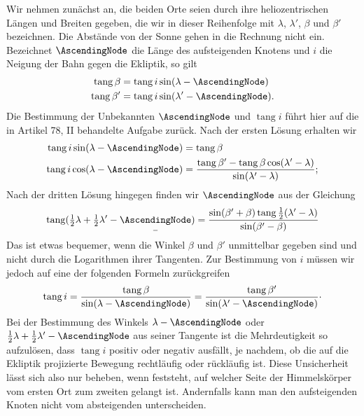 Wir nehmen zunächst an, die beiden Orte seien durch ihre heliozentrischen Längen und Breiten gegeben, die wir in dieser Reihenfolge mit $\lambda$, $\lambda'$, $\beta$ und $\beta'$ bezeichnen. Die Abstände von der Sonne gehen in die Rechnung nicht ein. Bezeichnet $\AscendingNode$ die Länge des aufsteigenden Knotens und $i$ die Neigung der Bahn gegen die Ekliptik, so gilt
\[
\begin{aligned}
\operatorname{tang}\beta&=\operatorname{tang}i\sin(\lambda-\AscendingNode)\\
\operatorname{tang}\beta'&=\operatorname{tang}i\sin(\lambda'-\AscendingNode).
\end{aligned}
\]
Die Bestimmung der Unbekannten $\AscendingNode$ und $\operatorname{tang}i$ führt hier auf die in Artikel 78, II behandelte Aufgabe zurück. Nach der ersten Lösung erhalten wir
\[
\begin{aligned}
\operatorname{tang}i\sin(\lambda-\AscendingNode)&=\operatorname{tang}\beta\\
\operatorname{tang}i\cos(\lambda-\AscendingNode)&=\frac{\operatorname{tang}\beta'-\operatorname{tang}\beta\cos(\lambda'-\lambda)}{\sin(\lambda'-\lambda)};
\end{aligned}
\]
Nach der dritten Lösung hingegen finden wir $\AscendingNode$ aus der Gleichung
\[
\operatorname{tang}(\tfrac12\lambda+\tfrac12\lambda'-\underset{\rule{.45em}{.35pt}}{\AscendingNode})=\frac{\sin(\beta'+\beta)\operatorname{tang}\tfrac12(\lambda'-\lambda)}{\sin(\beta'-\beta)}
\]
Das ist etwas bequemer, wenn die Winkel $\beta$ und $\beta'$ unmittelbar gegeben sind und nicht durch die Logarithmen ihrer Tangenten. Zur Bestimmung von $i$ müssen wir jedoch auf eine der folgenden Formeln zurückgreifen
\[
\operatorname{tang}i=\frac{\operatorname{tang}\beta}{\sin(\lambda-\AscendingNode)}=\frac{\operatorname{tang}\beta'}{\sin(\lambda'-\AscendingNode)}\mathpunct{\cdot}
\]
Bei der Bestimmung des Winkels $\lambda-\AscendingNode$ oder $\tfrac12\lambda+\tfrac12\lambda'-\AscendingNode$ aus seiner Tangente ist die Mehrdeutigkeit so aufzulösen, dass $\operatorname{tang}i$ positiv oder negativ ausfällt, je nachdem, ob die auf die Ekliptik projizierte Bewegung rechtläufig oder rückläufig ist. Diese Unsicherheit lässt sich also nur beheben, wenn feststeht, auf welcher Seite der Himmelskörper vom ersten Ort zum zweiten gelangt ist. Andernfalls kann man den aufsteigenden Knoten nicht vom absteigenden unterscheiden.

